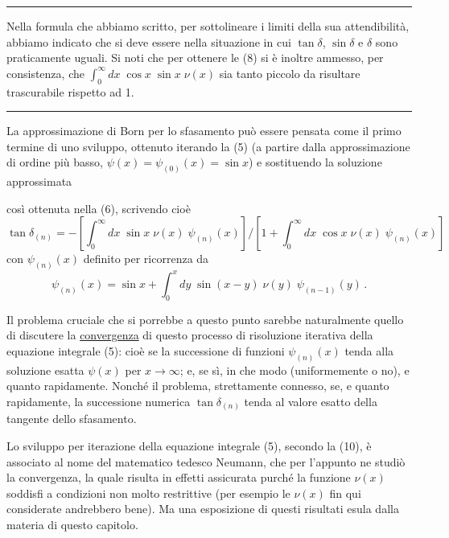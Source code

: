 \documentclass[11pt, a4paper]{book}
\numberwithin{equation}{section}
\begin{document}
\noindent\rule{\linewidth}{0.4pt}

Nella formula che abbiamo scritto, per sottolineare i limiti della sua attendibilità, abbiamo indicato che si deve essere nella situazione in cui $\tan\delta$, $\sin\delta$ e $\delta$ sono praticamente uguali. Si noti che per ottenere le (8) si è inoltre ammesso, per consistenza, che $\int_0^\infty dx\;\cos x\;\sin x\;\nu(x)$ sia tanto piccolo da risultare trascurabile rispetto ad 1.

\noindent\rule{\linewidth}{0.4pt}

La approssimazione di Born per lo sfasamento può essere pensata come il primo termine di uno sviluppo, ottenuto iterando la (5) (a partire dalla approssimazione di ordine più basso, $\psi(x) = \psi_{(0)}(x) = \sin x$) e sostituendo la soluzione approssimata


così ottenuta nella (6), scrivendo cioè
\begin{equation}
\tan\delta_{(n)} = -\left[\int_0^{\infty} dx\;\sin x\;\nu(x)\;\psi_{(n)}(x)\right]\Bigg/\left[1 + \int_0^{\infty} dx\;\cos x\;\nu(x)\;\psi_{(n)}(x)\right] \tag{9}
\end{equation}
con $\psi_{(n)}(x)$ definito per ricorrenza da
\begin{equation}
\psi_{(n)}(x) = \sin x + \int_0^x dy\;\sin(x-y)\;\nu(y)\;\psi_{(n-1)}(y)\,. \tag{10}
\end{equation}

Il problema cruciale che si porrebbe a questo punto sarebbe naturalmente quello di discutere la \uline{convergenza} di questo processo di risoluzione iterativa della equazione integrale (5): cioè se la successione di funzioni $\psi_{(n)}(x)$ tenda alla soluzione esatta $\psi(x)$ per $x \to \infty$; e, se sì, in che modo (uniformemente o no), e quanto rapidamente. Nonché il problema, strettamente connesso, se, e quanto rapidamente, la successione numerica $\tan\delta_{(n)}$ tenda al valore esatto della tangente dello sfasamento.

Lo sviluppo per iterazione della equazione integrale (5), secondo la (10), è associato al nome del matematico tedesco Neumann, che per l'appunto ne studiò la convergenza, la quale risulta in effetti assicurata purché la funzione $\nu(x)$ soddisfi a condizioni non molto restrittive (per esempio le $\nu(x)$ fin qui considerate andrebbero bene). Ma una esposizione di questi risultati esula dalla materia di questo capitolo.
\end{document}
